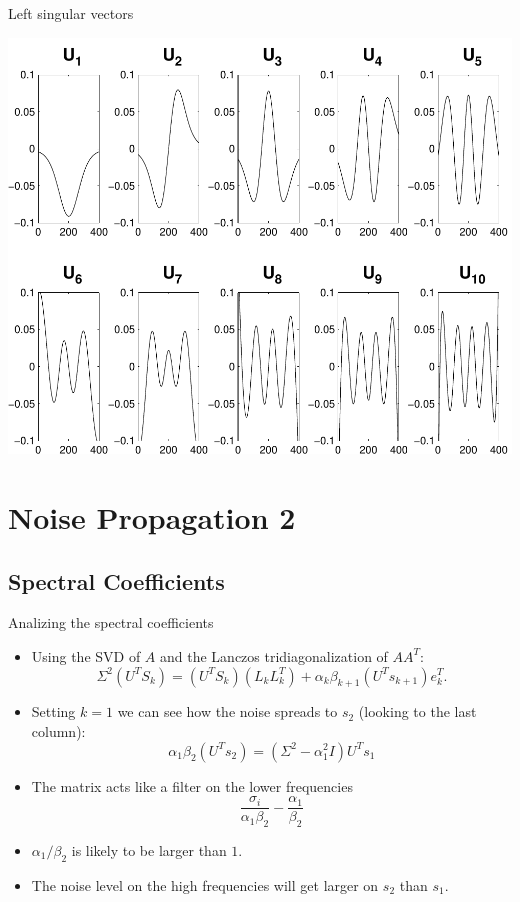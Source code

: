 \documentclass{beamer}
\begin{document}
\begin{frame}{Left singular vectors}
  \begin{center}
    \includegraphics[width=0.55\linewidth]{figures/run1/sing_vecs}
  \end{center}
\end{frame}

\section{Noise Propagation 2}
\subsection{Spectral Coefficients}
\begin{frame}{Analizing the spectral coefficients}
  \begin{itemize}
    \item Using the SVD of $A$ and the Lanczos tridiagonalization of $AA^{T}$:
      \begin{equation*}
	\Sigma^{2}(U^{T}S_{k}) = (U^{T}S_{k})(L_{k}L_{k}^{T}) + 
	\alpha_{k}\beta_{k+1}(U^{T}s_{k+1})e_{k}^{T}.
      \end{equation*}

    \item Setting $k=1$ we can see how the noise spreads to $s_{2}$ (looking to
      the last column):
      \begin{equation*}
	\alpha_{1}\beta_{2}(U^{T}s_{2}) = (\Sigma^{2} - 
	\alpha_{1}^{2}I)U^{T}s_{1}
      \end{equation*}
    
    \item The matrix acts like a filter on the lower frequencies
      \begin{equation*}
	\frac{\sigma_{i}}{\alpha_{1}\beta_{2}} - \frac{\alpha_{1}}{\beta_{2}}
      \end{equation*}
    
    \item $\alpha_{1}/\beta_{2}$ is likely to be larger than $1$.
    \item The noise level on the high frequencies will get larger on $s_{2}$
      than $s_{1}$.
  \end{itemize}
\end{frame}
\end{document}
